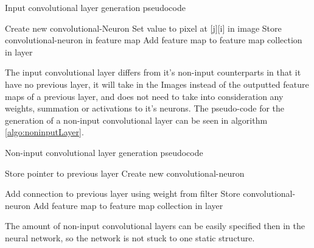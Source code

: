 \documentclass[10pt]{article}
\begin{document}
		\begin{algorithm}[h]
			\caption{Input convolutional layer generation pseudocode}
			\label{algo:inputLayer}
			\begin{algorithmic}[1]
							\State Create new convolutional-Neuron
							\State Set value to pixel at [j][i] in image
							\State Store convolutional-neuron in feature map
						\EndFor
					\EndFor
					\State Add feature map to feature map collection in layer
				\EndFor
				\EndProcedure
			\end{algorithmic}
		\end{algorithm}
		
		The input convolutional layer differs from it's non-input counterparts in that it have no previous layer, it will take in the Images instead of the outputted feature maps of a previous layer, and does not need to take into consideration any weights, summation or activations to it's neurons. The pseudo-code for the generation of a non-input convolutional layer can be seen in algorithm \ref{algo:noninputLayer}.\\
		
		\begin{algorithm}[h]
			\caption{Non-input convolutional layer generation pseudocode}
			\label{algo:noninputLayer}
			\begin{algorithmic}[1]
				\State Store pointer to previous layer
								\State Create new convolutional-neuron
								
										\State Add connection to previous layer using weight from filter										
									\EndFor									
								\EndFor
								\State Store convolutional-neuron
							\EndFor							
						\EndFor
						\State Add feature map to feature map collection in layer
					\EndFor					
				\EndFor
				
				\EndProcedure
			\end{algorithmic}
		\end{algorithm}
		The amount of non-input convolutional layers can be easily specified then in the neural network, so the network is not stuck to one static structure.\\		
		
\end{document}
